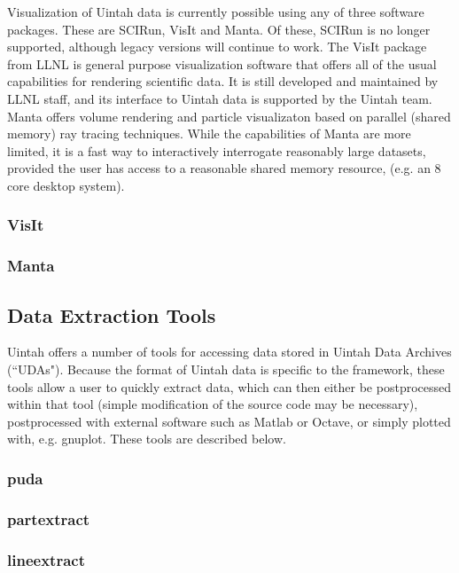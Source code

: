 Visualization of Uintah data is currently possible using any of three
software packages.  These are SCIRun, VisIt and Manta.  Of these, SCIRun is
no longer supported, although legacy versions will continue to work.  The
VisIt package from LLNL is general purpose visualization software that offers
all of the usual capabilities for rendering scientific data.  It is still
developed and maintained by LLNL staff, and its interface to Uintah data is
supported by the Uintah team.  Manta offers volume rendering and particle
visualizaton based on parallel (shared memory) ray tracing techniques.
While the capabilities of Manta are more limited, it is a fast way to
interactively interrogate reasonably large datasets, provided the user has
access to a reasonable shared memory resource, (e.g. an 8 core desktop system).

\subsubsection{VisIt}

\subsubsection{Manta}

\subsection{Data Extraction Tools}

Uintah offers a number of tools for accessing data stored in Uintah Data
Archives (``UDAs").  Because the format of Uintah data is specific to the 
framework, these tools allow a user to quickly extract data, which can then
either be postprocessed within that tool (simple modification of the source
code may be necessary), postprocessed with external software such as
Matlab or Octave, or simply plotted with, e.g. gnuplot.  These tools
are described below.

\subsubsection{puda}

\subsubsection{partextract}

\subsubsection{lineextract}

